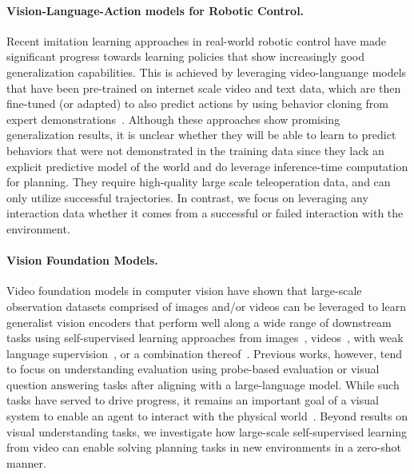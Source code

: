 \documentclass[]{fairmeta}
\begin{document}
\paragraph{\bf Vision-Language-Action models for Robotic Control.}
Recent imitation learning approaches in real-world robotic control have made significant progress towards learning policies that show increasingly good generalization capabilities.
This is achieved by leveraging video-languange models that have been pre-trained on internet scale video and text data, which are then fine-tuned (or adapted) to also predict actions by using behavior cloning from expert demonstrations~\citep{driess2023palm-e,brohan2023rt2,black2024pi0,kim2024openvla,bjorck2025gr00t,intelligence2025pi}. Although these approaches show promising generalization results, it is unclear whether they will be able to learn to predict behaviors that were not demonstrated in the training data since they lack an explicit predictive model of the world and do leverage inference-time computation for planning. They require high-quality large scale teleoperation data, and can only utilize successful trajectories. In contrast, we focus on leveraging any interaction data whether it comes from a successful or failed interaction with the environment. 

\paragraph{\bf Vision Foundation Models.}
Video foundation models in computer vision have shown that large-scale observation datasets comprised of images and/or videos can be leveraged to learn generalist vision encoders that perform well along a wide range of downstream tasks using self-supervised learning approaches from images~\citep{grill2020bootstrap,assran2023self,oquab2023dinov2,fan2025scaling}, videos~\citep{bardes2024revisiting,carreira2024scaling,wang2023videomae,rajasegaran2025empirical}, with weak language supervision~\citep{wang2024internvideo2,bolya_perception_encoder_2025}, or a combination thereof~\citep{tschannen2025siglip,fini2024multimodal}. Previous works, however, tend to focus on understanding evaluation using probe-based evaluation or visual question answering tasks after aligning with a large-language model. While such tasks have served to drive progress, it remains an important goal of a visual system to enable an agent to interact with the physical world~\citep{gibson2014ecological}. Beyond results on visual understanding tasks, we investigate how large-scale self-supervised learning from video can enable solving planning tasks in new environments in a zero-shot manner.
 
\end{document}
